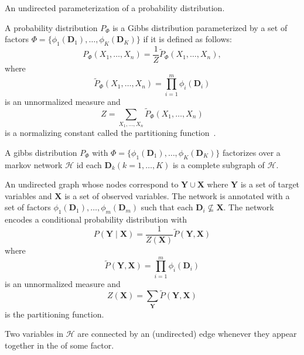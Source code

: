 {%
  An undirected parameterization of a \gls{probability distribution}.

  A \gls{probability distribution} $P_{\Phi}$ is a Gibbs distribution parameterized by a set of \glspl{factor} $\Phi=\{\phi_1(\bm{D}_1),\dots,\phi_K(\bm{D}_K)\}$ if it is defined as follows:
  \begin{equation*}
    P_{\Phi}(X_1,\dots,X_n)=\frac{1}{Z}\tilde{P}_{\Phi}(X_1,\dots,X_n),
  \end{equation*}
  where
  \begin{equation*}
    \tilde{P}_{\Phi}(X_1,\dots,X_n)=\prod_{i=1}^{m}\phi_i(\bm{D}_i)
  \end{equation*}
  is an unnormalized measure and
  \begin{equation*}
    Z=\sum_{X_1,\ldots,X_n}\tilde{P}_{\Phi}(X_1,\dots,X_n)
  \end{equation*}
  is a normalizing constant called the \gls{partitioning function}~\citep{koller2009probabilistic}.
}

{%
  A \gls{gibbs distribution} $P_{\Phi}$ with $\Phi=\{\phi_1(\bm{D}_1),\dots,\phi_K(\bm{D}_K)\}$ factorizes over a \gls{markov
network} $\mathcal{H}$ id each $\bm{D}_{k}(k=1,\dots,K)$ is a \gls{complete subgraph} of $\mathcal{H}$.
}

{%
An undirected \gls{graph} whose \glspl{node} correspond to $\bm{Y}\cup\bm{X}$ where $\bm{Y}$ is a set of \glspl{target variable} and $\bm{X}$ is a set of \glspl{observed variable}. The network is annotated with a set of \glspl{factor} $\phi_1(\bm{D}_1),\dots,\phi_m(\bm{D}_m)$ such that each $\bm{D}_i\nsubseteq\bm{X}$. The network encodes a \gls{conditional probability distribution} with
  \begin{equation*}
    P(\bm{Y}\mid\bm{X})=\frac{1}{Z(\bm{X})}\tilde{P}(\bm{Y},\bm{X})
  \end{equation*}
  where
  \begin{equation*}
    \tilde{P}(\bm{Y},\bm{X})=\prod_{i=1}^{m}\phi_i(\bm{D}_i)
  \end{equation*}
  is an unnormalized measure and
  \begin{equation*}
    Z(\bm{X})=\sum_{\bm{Y}}\tilde{P}(\bm{Y},\bm{X})
  \end{equation*}
  is the \gls{partitioning function}.

  Two variables in $\mathcal{H}$ are connected by an (undirected) \gls{edge} whenever they appear together in the  of some \gls{factor}.
}

